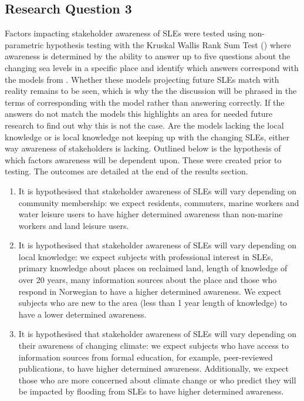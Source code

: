 \subsection{Research Question 3}
Factors  impacting stakeholder awareness of SLEs were tested using non-parametric hypothesis testing with the Kruskal Wallis Rank Sum Test (\cite{hollander_nonparametric_2014}) where awareness is determined by the ability to answer up to five questions about the changing sea levels in a specific place and identify which answers correspond with the models from \cite{kartverket_se_2020}. Whether these models projecting future SLEs match with reality remains to be seen, which is why the the discussion will be phrased in the terms of corresponding with the model rather than answering correctly. If the answers do not match the models this highlights an area for needed future research to find out why this is not the case. Are the models lacking the local knowledge or is local knowledge not keeping up with the changing SLEs, either way awareness of stakeholders is lacking. Outlined below is the hypothesis of which factors awareness will be dependent upon. These were created prior to testing. The outcomes are detailed at the end of the results section. 

\begin{enumerate}
    \item It is hypothesised that stakeholder awareness of SLEs will vary depending on community membership: we expect residents, commuters, marine workers and water leisure users to have higher determined awareness than non-marine workers and land leisure users.
  
    \item It is hypothesised that stakeholder awareness of SLEs will vary depending on local knowledge: we expect subjects with professional interest in SLEs,  primary knowledge about places on reclaimed land, length of knowledge of over 20 years, many information sources about the place and those who respond in Norwegian to have a higher determined awareness. We expect subjects who are new to the area (less than 1 year length of knowledge) to have a lower determined awareness.

    \item It is hypothesised that stakeholder awareness of SLEs will vary depending on their awareness of changing climate: we expect subjects who have access to information sources from formal education, for example, peer-reviewed publications, to have higher determined awareness. Additionally, we expect those who are more concerned about climate change or who predict they will be impacted by flooding from SLEs to have higher determined awareness. 
\end{enumerate}

